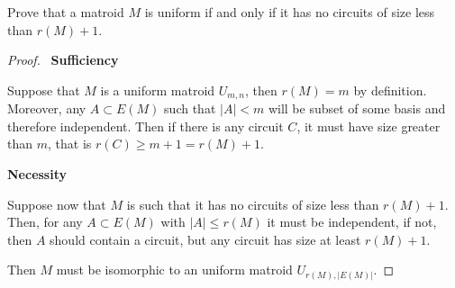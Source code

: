 \prob
{
    Prove that a matroid $M$ is uniform if and only if it has no circuits 
    of size less than $r(M) + 1$.
}
\begin{proof}
    $\,$\pn
    \textbf{Sufficiency}\pn

	Suppose that $M$ is a uniform matroid $U_{m, n}$, then $r(M) = m$ by definition.
    Moreover, any $A \subset E(M)$ such that $|A| < m$ will be subset of some basis and
    therefore independent. Then if there is any circuit $C$, it must have size greater
    than $m$, that is $r(C) \geq m + 1 = r(M) + 1$.\pn

    \textbf{Necessity}\pn
    
    Suppose now that $M$ is such that it has no circuits of size less than $r(M) + 1$.
    Then, for any $A \subset E(M)$ with $|A| \leq r(M)$ it must be independent, if not,
    then $A$ should contain a circuit, but any circuit has size at least $r(M) + 1$.\pn
    
    Then $M$ must be isomorphic to an uniform matroid $U_{r(M), |E(M)|}$.
\end{proof}